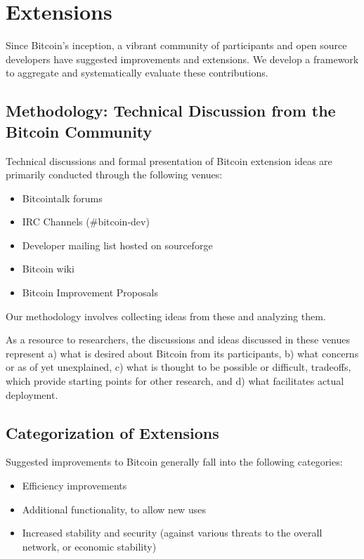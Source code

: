\section{Extensions}

Since Bitcoin's inception, a vibrant community of participants and open source developers have suggested improvements and extensions. We develop a framework to aggregate and systematically evaluate these contributions.

\subsection{Methodology: Technical Discussion from the Bitcoin Community}
Technical discussions and formal presentation of Bitcoin extension ideas are primarily conducted through the following venues:
\begin{itemize}
\item Bitcointalk forums
\item IRC Channels (\#bitcoin-dev)
\item Developer mailing list hosted on sourceforge
\item Bitcoin wiki
\item Bitcoin Improvement Proposals
\end{itemize}

Our methodology involves collecting ideas from these and analyzing them.

As a resource to researchers, the discussions and ideas discussed in these venues represent a) what is desired about Bitcoin from its participants, b) what concerns or as of yet unexplained, c) what is thought to be possible or difficult, tradeoffs, which provide starting points for other research, and d) what facilitates actual deployment.

\subsection{Categorization of Extensions}

Suggested improvements to Bitcoin generally fall into the following categories:
\begin{itemize}
\item Efficiency improvements
\item Additional functionality, to allow new uses
\item Increased stability and security (against various threats to the overall network, or economic stability)
\end{itemize}


